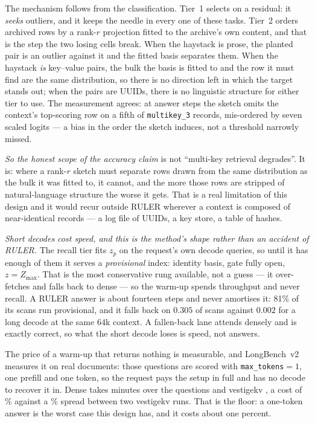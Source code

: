 The mechanism follows from the classification. Tier~1 selects on a residual: it
\emph{seeks} outliers, and it keeps the needle in every one of these tasks.
Tier~2 orders archived rows by a rank-$r$ projection fitted to the archive's own
content, and that is the step the two losing cells break. When the haystack is
prose, the planted pair is an outlier against it and the fitted basis separates
them. When the haystack \emph{is} key--value pairs, the bulk the basis is fitted
to and the row it must find are the same distribution, so there is no direction
left in which the target stands out; when the pairs are UUIDs, there is no
linguistic structure for either tier to use. The measurement agrees: at answer
steps the sketch omits the context's top-scoring row on a fifth of
\texttt{multikey\_3} records, mis-ordered by seven scaled logits --- a bias in
the order the sketch induces, not a threshold narrowly missed.

\emph{So the honest scope of the accuracy claim} is not ``multi-key retrieval
degrades''. It is: where a rank-$r$ sketch must separate rows drawn from the
same distribution as the bulk it was fitted to, it cannot, and the more those
rows are stripped of natural-language structure the worse it gets. That is a
real limitation of this design and it would recur outside RULER wherever a
context is composed of near-identical records --- a log file of UUIDs, a key
store, a table of hashes.

\emph{Short decodes cost speed, and this is the method's shape rather than an
accident of RULER.} The recall tier fits $z_p$ on the request's own decode
queries, so until it has enough of them it serves a \emph{provisional} index:
identity basis, gate fully open, $z=Z_{\max}$. That is the most conservative
rung available, not a guess --- it over-fetches and falls back to dense --- so
the warm-up spends throughput and never recall. A RULER answer is about
fourteen steps and never amortises it: 81\% of its scans run provisional, and
it falls back on $0.305$ of scans against $0.002$ for a long decode at the same
64k context. A fallen-back lane attends densely and is exactly correct, so what
the short decode loses is speed, not answers.

The price of a warm-up that returns nothing is measurable, and LongBench~v2
measures it on real documents: those questions are scored with
\texttt{max\_tokens}${=}1$, one prefill and one token, so the request pays the
setup in full and has no decode to recover it in. Dense takes \lbKDWall{}
minutes over the \lbKDN{} questions and vestigekv \lbKVWall{}, a cost of
\lbKCost{}\% against a \lbKVSpread{}\% spread between two vestigekv runs. That
is the floor: a one-token answer is the worst case this design has, and it
costs about one percent.


